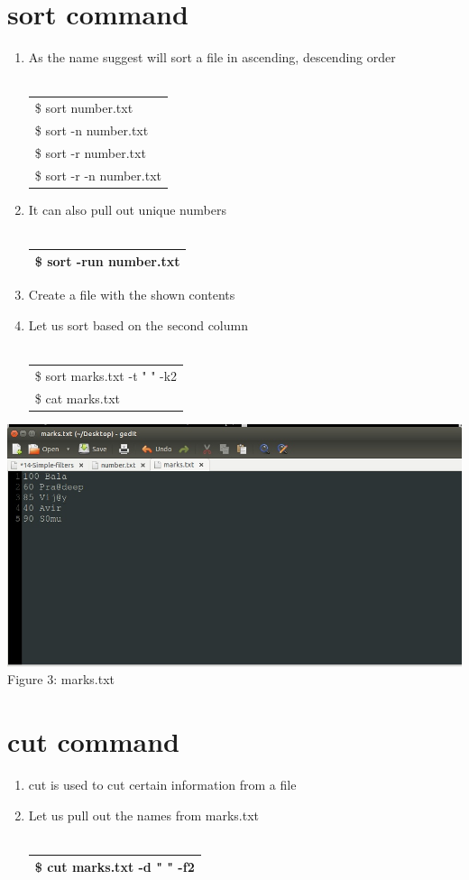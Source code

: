 \documentclass[12pt, a4paper]{report}
\begin{document}
\section{sort command}
\begin{enumerate}
\item As the name suggest will sort a file in ascending, descending order\\
\\
\begin{tabular}{|l|}\hline
\$ sort number.txt\\
\$ sort -n number.txt\\
\$ sort -r number.txt\\
\$ sort -r -n number.txt\\ \hline
\end{tabular}
\item It can also pull out unique numbers\\
\\
\begin{tabular}{|l|}\hline
\$ sort -run number.txt\\ \hline
\end{tabular}
\item Create a file with the shown contents
\item Let us sort based on the second column\\
\\
\begin{tabular}{|l|}\hline
\$ sort marks.txt -t " " -k2\\
\$ cat marks.txt\\ \hline
\end{tabular}
\end{enumerate}
\includegraphics[width=\textwidth]{14_sf.jpg}\\
Figure 3: marks.txt
\section{cut command}
\begin{enumerate}
\item cut is used to cut certain information from a file
\item Let us pull out the names from marks.txt\\
\\
\begin{tabular}{|l|}\hline
\$ cut marks.txt -d " " -f2\\ \hline
\end{tabular}
\end{enumerate}
\end{document}
